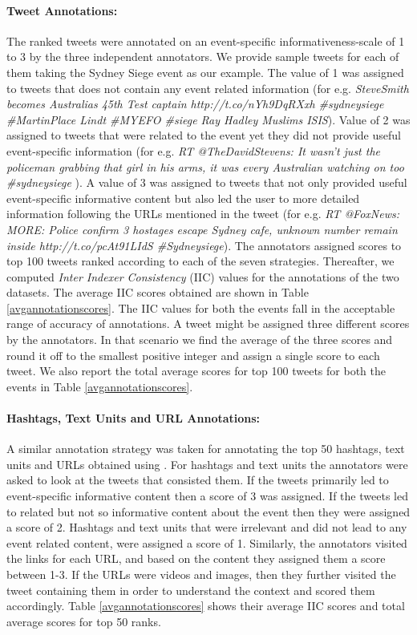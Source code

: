 \paragraph{Tweet Annotations:} The ranked tweets were annotated on an event-specific informativeness-scale of 1 to 3 by the three independent annotators. We provide sample tweets for each of them taking the Sydney Siege event as our example. The value of 1 was assigned to tweets that does not contain any event related information (for e.g. \textit{SteveSmith becomes Australias 45th Test captain http://t.co/nYh9DqRXxh \#sydneysiege \#MartinPlace Lindt \#MYEFO \#siege Ray Hadley Muslims ISIS}). Value of 2 was assigned to tweets that were related to the event yet they did not provide useful event-specific information (for e.g. \textit{RT @TheDavidStevens: It wasn't just the policeman grabbing that girl in his arms, it was every Australian watching on too \#sydneysiege} ). A value of 3 was assigned to tweets that not only provided useful event-specific informative content but also led the user to more detailed information following the URLs mentioned in the tweet (for e.g. \textit{RT @FoxNews: MORE: Police confirm 3 hostages escape Sydney cafe, unknown number remain inside http://t.co/pcAt91LIdS \#Sydneysiege}).  The annotators assigned scores to top 100 tweets ranked according to each of the seven strategies. Thereafter, we computed \textit{Inter Indexer Consistency} (IIC) values \cite{rolling1981indexing} for the annotations of the two datasets. The average IIC scores obtained are shown in Table \ref{avgannotationscores}. The IIC values for both the events fall in the acceptable range of accuracy of annotations. A tweet might be assigned three different scores by the annotators. In that scenario we find the average of the three scores and round it off to the smallest positive integer and assign a single score to each tweet. We also report the total average scores for top 100 tweets for both the events in Table \ref{avgannotationscores}. 

\paragraph{Hashtags, Text Units and URL Annotations:} A similar annotation strategy was taken for annotating the top 50 hashtags, text units and URLs obtained using . For hashtags and text units the annotators were asked to look at the tweets that consisted them. If the tweets primarily led to event-specific informative content then a score of 3 was assigned. If the tweets led to related but not so informative content about the event then they were assigned a score of 2. Hashtags and text units that were irrelevant and did not lead to any event related content, were assigned a score of 1. Similarly, the annotators visited the links for each URL, and based on the content they assigned them a score between 1-3. If the URLs were videos and images, then they further visited the tweet containing them in order to understand the context and scored them accordingly. Table \ref{avgannotationscores} shows their average IIC scores and total average scores for top 50 ranks. 

